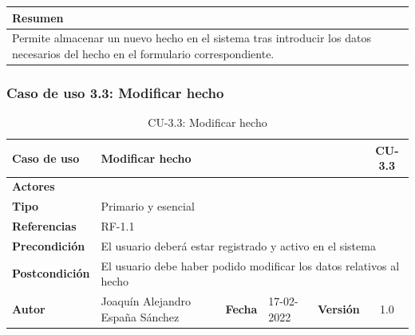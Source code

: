     \begin{table}[H]
        \centering
        \begin{tabularx}{\textwidth}{@{} |L |@{}} \hline
            \textbf{Resumen} \\
            \hline
            Permite almacenar un nuevo hecho en el sistema tras introducir los datos
            necesarios del hecho en el formulario correspondiente.\\
            \hline
        \end{tabularx}
    \end{table}

\subsubsection{Caso de uso 3.3: Modificar hecho}

    \begin{table}[H]
    \begin{center}
        \begin{adjustbox}{width=\textwidth}
        \begin{tabular}{ | l | l | l | l | c | c | } 
            \hline
            \textbf{Caso de uso} & \multicolumn{4}{l|}{Modificar hecho} & \cellcolor{gray!50} \textbf{CU-3.3}\\
            \hline
            \textbf{Actores} & \multicolumn{5}{p{0.9\linewidth}|}{ } \\
            \hline
            \textbf{Tipo} & \multicolumn{5}{l|}{Primario y esencial} \\
            \hline
            \textbf{Referencias} & \multicolumn{3}{l|}{RF-1.1} & \multicolumn{2}{l|}{ }\\
            \hline
            \textbf{Precondición} & \multicolumn{5}{l|}{El usuario deberá estar registrado y activo en el sistema} \\
            \hline
            \textbf{Postcondición} & \multicolumn{5}{l|}{El usuario debe haber podido modificar los datos relativos al hecho} \\
            \hline
            \textbf{Autor} & \multicolumn{1}{p{0.25\linewidth}|}{Joaquín Alejandro España Sánchez} & \textbf{Fecha} & 
            17-02-2022     & \textbf{Versión}                                                      & 1.0\\
            \hline
        \end{tabular}
        \end{adjustbox}
        \caption{CU-3.3: Modificar hecho}
        \label{tab:modify-fact}
    \end{center}
    \end{table}

